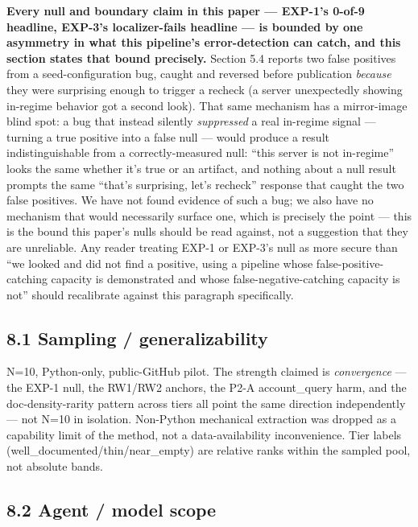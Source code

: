 \textbf{Every null and boundary claim in this paper --- EXP-1's 0-of-9
headline, EXP-3's localizer-fails headline --- is bounded by one
asymmetry in what this pipeline's error-detection can catch, and this
section states that bound precisely.} Section 5.4 reports two
false positives from a seed-configuration bug, caught and reversed
before publication \emph{because} they were surprising enough to trigger
a recheck (a server unexpectedly showing in-regime behavior got a second
look). That same mechanism has a mirror-image blind spot: a bug that
instead silently \emph{suppressed} a real in-regime
signal --- turning a true positive into a false null --- would produce a
result indistinguishable from a correctly-measured null: ``this server
is not in-regime'' looks the same whether it's true or an artifact, and
nothing about a null result prompts the same ``that's surprising, let's
recheck'' response that caught the two false positives. We have not
found evidence of such a bug; we also have no mechanism that would
necessarily surface one, which is precisely the point --- this is the
bound this paper's nulls should be read against, not a suggestion that
they are unreliable. Any reader treating EXP-1 or EXP-3's null as more
secure than ``we looked and did not find a positive, using a pipeline
whose false-positive-catching capacity is demonstrated and whose
false-negative-catching capacity is not'' should recalibrate against
this paragraph specifically.

\hypertarget{sampling-generalizability}{%
\subsection{8.1 Sampling /
generalizability}\label{sampling-generalizability}}

N=10, Python-only, public-GitHub pilot. The strength claimed is
\emph{convergence} --- the EXP-1 null, the RW1/RW2 anchors, the P2-A
account\_query harm, and the doc-density-rarity pattern across tiers all
point the same direction independently --- not N=10 in isolation.
Non-Python mechanical extraction was dropped as a capability limit of
the method, not a data-availability inconvenience. Tier labels
(well\_documented/thin/near\_empty) are relative ranks within the
sampled pool, not absolute bands.

\hypertarget{agent-model-scope}{%
\subsection{8.2 Agent / model scope}\label{agent-model-scope}}

